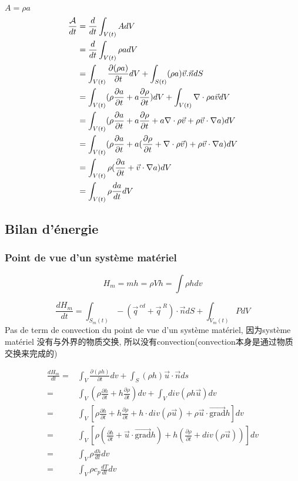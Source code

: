 \documentclass{article}
\begin{document}
\begin{example}
$A = \rho a$
$$
\begin{aligned}
\dfrac{\mathcal{A}}{dt} 
& = \dfrac{d}{dt} \int_{V(t)} A dV \\
& = \dfrac{d}{dt} \int_{V(t)} \rho a dV \\
& = \int_{V(t)} \frac{\partial (\rho a)}{\partial t}dV + \int_{S(t)} (\rho a) \vec{v} . \vec{n}dS \\
& = \int_{V(t)} (\rho \frac{\partial a}{\partial t} + a \frac{\partial \rho}{\partial t})dV + \int_{V(t)} \nabla \cdot \rho a \vec{v}dV \\
& = \int_{V(t)} (\rho \frac{\partial a}{\partial t} + a \frac{\partial \rho}{\partial t} + a \nabla \cdot \rho \vec{v} + \rho \vec{v}\cdot \nabla a)dV \\
& = \int_{V(t)} (\rho \frac{\partial a}{\partial t} + a (\frac{\partial \rho}{\partial t} + \nabla \cdot \rho \vec{v}) + \rho \vec{v}\cdot \nabla a)dV \\
& = \int_{V(t)} \rho (\frac{\partial a}{\partial t} + \vec{v} \cdot \nabla a)dV \\
& = \int_{V(t)} \rho \frac{da}{dt}dV
\end{aligned}
$$
\end{example}

\subsection{Bilan d'\'energie}
\subsubsection{Point de vue d'un syst\`eme mat\'eriel}
$$H_m = mh=\rho V h=\int \rho h dv$$

\begin{equation}
\dfrac{d H_m}{dt} = \int_{S_m(t)} -(\vec{q}^{\ cd} + \vec{q}^{\ R})\cdot \vec{n}dS + \int_{V_m(t)} P dV
\end{equation}
Pas de term de convection du point de vue d'un syst\`eme mat\'eriel, 
因为syst\`eme mat\'eriel 没有与外界的物质交换, 所以没有convection(convection本身是通过物质交换来完成的)

\begin{equation}
 	\begin{split}
	 \frac{ dH_m}{dt}
	 = & \int_V \frac{\partial (\rho h)}{\partial t}dv+ \int_S (\rho h)\vec{u} \cdot \vec{n}ds \\
	 = & \int_V (\rho \frac{\partial h}{\partial t}+ h \frac{ \partial \rho}{\partial t})dv+ \int_V div(\rho h\vec{u})dv \\
	 = & \int_V [\rho \frac{\partial h}{\partial t}+ h \frac{ \partial \rho}{\partial t}+ h \cdot div(\rho \vec{u}) +\rho\vec{u}\cdot \vec{\mbox{grad}} h]dv \\
	 = & \int_V [\rho ( \frac{\partial h}{\partial t} + \vec{u}\cdot \vec{\mbox{grad}} h )+ h (\frac{ \partial \rho}{\partial t}+ div(\rho \vec{u}))]dv \\
	 = & \int_V \rho \frac{ dh}{dt}dv \\
	 = & \int_V \rho c_p\frac{dT}{dt}dv
	\end{split}
\end{equation}
\end{document}
